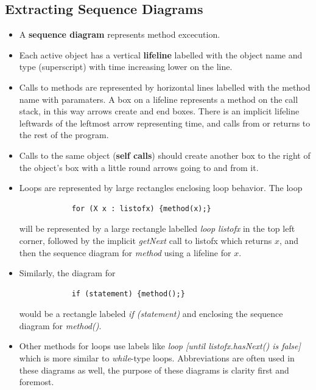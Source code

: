 \documentclass[letterpaper] {article}
\begin{document}
    \subsection{Extracting Sequence Diagrams}
    \begin{itemize}
        \item A \textbf{sequence diagram} represents method excecution. 
        \item Each active object has a vertical \textbf{lifeline} labelled with the object name and type (superscript) with time increasing lower on the line. 
        \item Calls to methods are represented by horizontal lines labelled with the method name with paramaters. A box on a lifeline represents a method on the call stack, in this way arrows create and end boxes. There is an implicit lifeline leftwards of the leftmost arrow representing time, and calls from or returns to the rest of the program. 
        \item Calls to the same object (\textbf{self calls}) should create another box to the right of the object's box with a little round arrows going to and from it. 
        \item Loops are represented by large rectangles enclosing loop behavior. The loop
            \begin{lstlisting}
            for (X x : listofx) {method(x);}
            \end{lstlisting}
            will be represented by a large rectangle labelled \textit{loop listofx} in the top left corner, followed by the implicit \textit{getNext} call to listofx which returns $x$, and then the sequence diagram for \textit{method} using a lifeline for $x$. 
        \item Similarly, the diagram for 
            \begin{lstlisting}
            if (statement) {method();}
            \end{lstlisting}
            would be a rectangle labeled \textit{if (statement)} and enclosing the sequence diagram for \textit{method()}. 
        \item Other methods for loops use labels like \textit{loop [until listofx.hasNext() is false]} which is more similar to \textit{while}-type loops. Abbreviations are often used in these diagrams as well, the purpose of these diagrams is clarity first and foremost. 
    \end{itemize}
    
\end{document}

